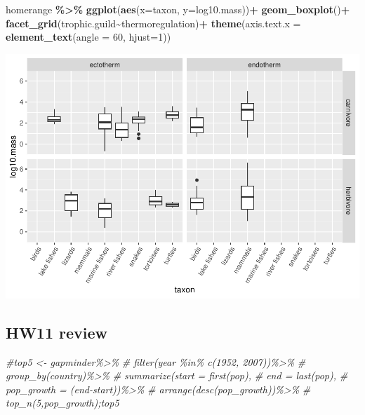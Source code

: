 \documentclass[
]{article}
\newenvironment{Shaded}{\begin{snugshade}}{\end{snugshade}}
\newcommand{\AttributeTok}[1]{\textcolor[rgb]{0.13,0.29,0.53}{#1}}
\newcommand{\CommentTok}[1]{\textcolor[rgb]{0.56,0.35,0.01}{\textit{#1}}}
\newcommand{\DecValTok}[1]{\textcolor[rgb]{0.00,0.00,0.81}{#1}}
\newcommand{\FunctionTok}[1]{\textcolor[rgb]{0.13,0.29,0.53}{\textbf{#1}}}
\newcommand{\NormalTok}[1]{#1}
\newcommand{\SpecialCharTok}[1]{\textcolor[rgb]{0.81,0.36,0.00}{\textbf{#1}}}
\begin{document}
\begin{Shaded}
\begin{Highlighting}[]
\NormalTok{homerange }\SpecialCharTok{\%\textgreater{}\%} 
  \FunctionTok{ggplot}\NormalTok{(}\FunctionTok{aes}\NormalTok{(}\AttributeTok{x=}\NormalTok{taxon, }\AttributeTok{y=}\NormalTok{log10.mass))}\SpecialCharTok{+}
  \FunctionTok{geom\_boxplot}\NormalTok{()}\SpecialCharTok{+}
  \FunctionTok{facet\_grid}\NormalTok{(trophic.guild}\SpecialCharTok{\textasciitilde{}}\NormalTok{thermoregulation)}\SpecialCharTok{+}
  \FunctionTok{theme}\NormalTok{(}\AttributeTok{axis.text.x =} \FunctionTok{element\_text}\NormalTok{(}\AttributeTok{angle =} \DecValTok{60}\NormalTok{, }\AttributeTok{hjust=}\DecValTok{1}\NormalTok{))}
\end{Highlighting}
\end{Shaded}

\includegraphics{Untitled_files/figure-latex/unnamed-chunk-47-1.pdf}

\hypertarget{hw11-review}{%
\subsection{HW11 review}\label{hw11-review}}

\begin{Shaded}
\begin{Highlighting}[]
\CommentTok{\#top5 \textless{}{-} gapminder\%\textgreater{}\%}
\CommentTok{\#  filter(year \%in\% c(1952, 2007))\%\textgreater{}\%}
\CommentTok{\#  group\_by(country)\%\textgreater{}\%}
\CommentTok{\#  summarize(start = first(pop),}
\CommentTok{\#            end = last(pop),}
\CommentTok{\#            pop\_growth = (end{-}start))\%\textgreater{}\%}
\CommentTok{\#  arrange(desc(pop\_growth))\%\textgreater{}\%}
\CommentTok{\#  top\_n(5,pop\_growth);top5}
\end{Highlighting}
\end{Shaded}
\end{document}

